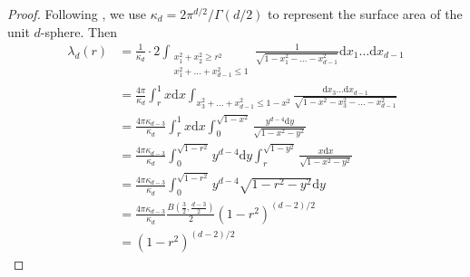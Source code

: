 \documentclass{aptpub}
\def\d{\mathrm{d}}
\begin{document}
\begin{proof}
     Following \cite{dwyer1991convex}, we use $\kappa_d = 2\pi^{d/2}/\Gamma(d/2)$
     to represent the surface area of the unit $d$-sphere. Then
     \begin{align*}
          \lambda_d(r) &=\frac{1}{\kappa_d} 
          \cdot 2\int_{\substack{x_1^2+x_2^2\geq r^2\\
          x_1^2+\dots+x_{d-1}^2\leq 1 }} 
          \frac{1}{\sqrt{1-x_1^2-\dots -x_{d-1}^2}} \d x_1 \dots \d x_{d-1}\\
      &= \frac{4\pi}{\kappa_d} \int_r^1 x\d x \int_{x_3^2+\dots + x_{d-1}^2 \leq 1-x^2} \frac{\d x_3\dots \d x_{d-1}}
      {\sqrt{1-x^2-x_3^2-\dots -x_{d-1}^2}} \\
      &=\frac{4\pi \kappa_{d-3}}{\kappa_d} \int_r^1 x\d x \int_0^{\sqrt{1-x^2}} \frac{y^{d-4}\d y}{\sqrt{1-x^2-y^2}}\\
      &=\frac{4\pi \kappa_{d-3}}{\kappa_d} \int_0^{\sqrt{1-r^2}} y^{d-4}\d y \int_r^{\sqrt{1-y^2}} \frac{x\d x}{\sqrt{1-x^2-y^2}}\\
      &=\frac{4\pi \kappa_{d-3}}{\kappa_d} \int_0^{\sqrt{1-r^2}} y^{d-4}\sqrt{1-r^2-y^2} \d y\\
      &=\frac{4\pi \kappa_{d-3}}{\kappa_d}  \frac{B(\frac{3}{2 }, \frac{d-3}{2})}{2}(1-r^2)^{(d-2)/2}\\
      &=  (1-r^2)^{(d-2)/2}
      \end{align*}
\end{proof}
\end{document}
